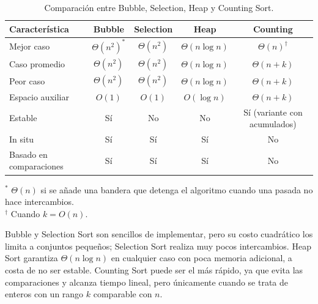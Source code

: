 \begin{table}[h]
  \centering
  \caption{Comparación entre Bubble, Selection, Heap y Counting Sort.}
  \begin{tabular}{lcccc}
    \toprule
    \textbf{Característica} & \textbf{Bubble} & \textbf{Selection} & \textbf{Heap} & \textbf{Counting} \\
    \midrule
    Mejor caso       & $\Theta(n^2)^{*}$ & $\Theta(n^2)$ & $\Theta(n \log n)$ & $\Theta(n)^{\dagger}$ \\
    Caso promedio    & $\Theta(n^2)$     & $\Theta(n^2)$ & $\Theta(n \log n)$ & $\Theta(n+k)$ \\
    Peor caso        & $\Theta(n^2)$     & $\Theta(n^2)$ & $\Theta(n \log n)$ & $\Theta(n+k)$ \\
    Espacio auxiliar & $O(1)$            & $O(1)$        & $O(\log n)$        & $\Theta(n+k)$ \\
    Estable          & Sí                & No            & No                 & Sí (variante con acumulados) \\
    In situ          & Sí                & Sí            & Sí                 & No \\
    Basado en comparaciones & Sí         & Sí            & Sí                 & No \\
    \bottomrule
  \end{tabular}

  \smallskip
  {\footnotesize $^{*}$ $\Theta(n)$ si se añade una bandera que detenga el algoritmo cuando una pasada no hace intercambios. \\
  $^{\dagger}$ Cuando $k = O(n)$.}
\end{table}

Bubble y Selection Sort son sencillos de implementar, pero su costo cuadrático los limita a conjuntos pequeños; Selection Sort realiza muy pocos intercambios. Heap Sort garantiza $\Theta(n \log n)$ en cualquier caso con poca memoria adicional, a costa de no ser estable. Counting Sort puede ser el más rápido, ya que evita las comparaciones y alcanza tiempo lineal, pero únicamente cuando se trata de enteros con un rango $k$ comparable con $n$.
